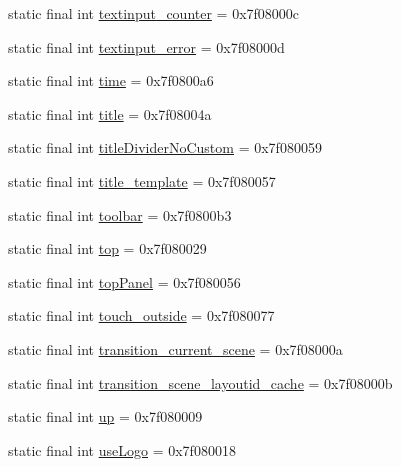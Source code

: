 \begin{CompactItemize}
\item 
static final int \hyperlink{classandroid_1_1support_1_1mediacompat_1_1_r_1_1id_6103a13421242140d45b06bbb9818c88}{textinput\_\-counter} = 0x7f08000c
\item 
static final int \hyperlink{classandroid_1_1support_1_1mediacompat_1_1_r_1_1id_2c717714be04dabb58a1fc06349de737}{textinput\_\-error} = 0x7f08000d
\item 
static final int \hyperlink{classandroid_1_1support_1_1mediacompat_1_1_r_1_1id_960bd9132858fa28e2c733f8862c5a50}{time} = 0x7f0800a6
\item 
static final int \hyperlink{classandroid_1_1support_1_1mediacompat_1_1_r_1_1id_37f924bcff06c757deeda7149b0c2a63}{title} = 0x7f08004a
\item 
static final int \hyperlink{classandroid_1_1support_1_1mediacompat_1_1_r_1_1id_1339fbf247e2e6912fcfd012b255c8dd}{titleDividerNoCustom} = 0x7f080059
\item 
static final int \hyperlink{classandroid_1_1support_1_1mediacompat_1_1_r_1_1id_06e07690fbea73fa2c3867f30f872b60}{title\_\-template} = 0x7f080057
\item 
static final int \hyperlink{classandroid_1_1support_1_1mediacompat_1_1_r_1_1id_ef6267d3cf11c1387e2732ae8d1f5d1e}{toolbar} = 0x7f0800b3
\item 
static final int \hyperlink{classandroid_1_1support_1_1mediacompat_1_1_r_1_1id_bd3bda2e3d331d31daabca7aea1ff1d4}{top} = 0x7f080029
\item 
static final int \hyperlink{classandroid_1_1support_1_1mediacompat_1_1_r_1_1id_b48c9f958f7267b59e291f45238d60c0}{topPanel} = 0x7f080056
\item 
static final int \hyperlink{classandroid_1_1support_1_1mediacompat_1_1_r_1_1id_afaf468722de8777acc5b01c8e3e47e5}{touch\_\-outside} = 0x7f080077
\item 
static final int \hyperlink{classandroid_1_1support_1_1mediacompat_1_1_r_1_1id_c46c02f7f57182cf998a663ae8e7b7e9}{transition\_\-current\_\-scene} = 0x7f08000a
\item 
static final int \hyperlink{classandroid_1_1support_1_1mediacompat_1_1_r_1_1id_25dfb106b3f58c364086c2061d506f06}{transition\_\-scene\_\-layoutid\_\-cache} = 0x7f08000b
\item 
static final int \hyperlink{classandroid_1_1support_1_1mediacompat_1_1_r_1_1id_4969b0be649fabcfc0921c421d34ffae}{up} = 0x7f080009
\item 
static final int \hyperlink{classandroid_1_1support_1_1mediacompat_1_1_r_1_1id_2297ad8bf733209dc24893507456e314}{useLogo} = 0x7f080018

\end{CompactItemize}
